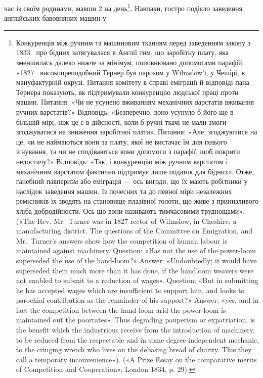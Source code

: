час із своїм родинами, мавши 2 на день\footnote{
Конкуренція між ручним та машиновим тканням перед заведенням
закону з 1833~ про бідних затягувалася в Англії тим, що заробітну
плату, яка зменшилась далеко нижче за мінімум, поповнювано
допомогами парафій. «1827~ високопреподобний Тернер був парохом у
Wilmslow’i, у Чешірі, в мануфактурній окрузі. Питання комітету в справі
еміграції й відповіді пана Тернера показують, як підтримували конкуренцію
людської праці проти машин. Питання: «Чи не усунено вживанням
механічних варстатів вживання ручних варстатів?» Відповідь: «Безперечно,
воно усунуло б його ще в більшій мірі, ніж це є в дійсності, коли б
ручні ткачі не мали змоги згоджуватися на зниження заробітної плати».
Питання: «Але, згоджуючися на це, чи не наймаються вони за плату,
якої не вистачає їм для їхнього існування, та чи не сподіваються вони
допомоги з парафії, щоб покрити недостачу?» Відповідь: «Так, і конкуренцію
між ручним варстатом і механічним варстатом фактично підтримує
лише податок для бідних». Отже, ганебний павперизм або еміграція — ось
вигоди, що їх мають робітники у наслідок заведення машин. Із почесних
та до певної міри незалежних ремісників їх зводять на становище плазівної
голоти, що живе з принизливого хліба добродійности. Ось що
вони називають тимчасовими труднощами». («The Rev. Mr.~Turner was
in 1827 rector of Wilmslow, in Cheshire, a manufacturing district. The questions
of the Committee on Emigration, and Mr.~Turner’s answers show
how the competition of human labour is maintained against machinery.
Question: «Has not the use of the power-loom superseded the use of the
hand-loom?» Answer: «Undoubtedly; it would have superseded them much
more than it has done, if the handloom weavers were not enabled to submit
to a reduction of wages». Question: «But in submitting he has accepted wages
which are insufficient to support him, and looks to parochial contribution
as the remainder of his support?» Answer: «yes, and in fact the competition
between the hand-loom arid the power-loom is maintained out the poorrates».
Thus degrading pauperism or expatriation, is the benefit which the
industrious receive from the introduction of machinery, to be reduced from
the respectable and in some degree independent mechanic, to the cringing
wretch who lives on the debasing bread of charity. This they call a temporary
inconvenience»). («A Prize Essay on the comparative merits of Competition
and Cooperation», London 1834, p. 29).
}. Навпаки, гостро подіяло заведення англійських бавовняних машин у
